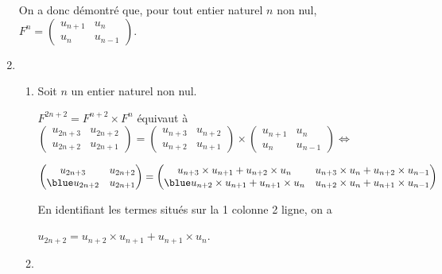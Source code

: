 \documentclass[10pt,a4paper]{article}
\begin{document}
\begin{enumerate}

On a donc démontré que, pour tout entier naturel $n$ non nul, $F^n = \begin{pmatrix} u_{n+1} & u_n \\ u_n & u_{n-1} \end{pmatrix}$.

\item 
\begin{enumerate}
\item Soit $n$ un entier naturel non nul. %

$F^{2n+2} = F^{n+2}\times F^{n}$ équivaut à
$\begin{pmatrix} u_{2n+3} & u_{2n+2} \\ u_{2n+2} & u_{2n+1} \end{pmatrix}
=
\begin{pmatrix} u_{n+3} & u_{n+2} \\ u_{n+2} & u_{n+1} \end{pmatrix}
\times
\begin{pmatrix} u_{n+1} & u_n \\ u_n & u_{n-1} \end{pmatrix} \iff$

$\begin{pmatrix} u_{2n+3} & {u_{2n+2}} \\ {\blue u_{2n+2}} & u_{2n+1} \end{pmatrix}
=
\begin{pmatrix} u_{n+3}\times u_{n+1}+u_{n+2}\times u_n &  u_{n+3}\times u_n + u_{n+2}\times u_{n-1}  \\ {\blue u_{n+2}\times u_{n+1} + u_{n+1}\times u_n} & u_{n+2}\times u_n + u_{n+1}\times u_{n-1} \end{pmatrix}$

En identifiant les termes situés sur la 1\iere{} colonne 2\ieme{} ligne, on a

\hfill{}$u_{2n+2} = u_{n+2}\times u_{n+1} + u_{n+1}\times u_n$.\hfill{}

\item%


\end{enumerate}
\end{enumerate}
\end{document}

